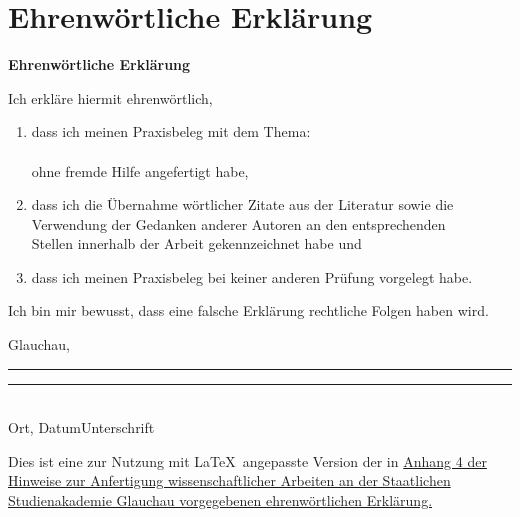 
\cleardoublepage 
\section{Ehrenwörtliche Erklärung}
\vspace*{1cm}
\begin{center}
\huge\textbf{Ehrenwörtliche Erklärung}\\
\end{center}
\vspace*{1cm}
\normalsize
Ich erkläre hiermit ehrenwörtlich,

\begin{enumerate}
	\vspace{1cm}
	\item dass ich meinen Praxisbeleg mit dem Thema:\\
	
	\textbf{\titel }\\

	ohne fremde Hilfe angefertigt habe,
	\item dass ich die Übernahme wörtlicher Zitate aus der Literatur sowie die\\ 		  
	Verwendung der Gedanken anderer Autoren an den entsprechenden\\
	Stellen innerhalb der Arbeit gekennzeichnet habe und
	\item dass ich meinen Praxisbeleg bei keiner anderen Prüfung vorgelegt habe.\\[1,5cm]
\end{enumerate}
Ich bin mir bewusst, dass eine falsche Erklärung rechtliche Folgen haben wird.\\[1,5cm]
			
\vfill

Glauchau, \abgabedatum \newline\noindent\rule{0.35\columnwidth}{0.4pt}\hspace{0.05\columnwidth}\rule{0.6\columnwidth}{0.4pt}\\
Ort, Datum\hspace{0.27\columnwidth}Unterschrift

{\footnotesize Dies ist eine zur Nutzung mit \LaTeX\ angepasste Version der in \href{https://www.ba-glauchau.de/fileadmin/glauchau/waehrend-des-studium/dokumente/pruefungen/4BA-F.207_Hinweise_zur_Anfertigung_wissenschaftlicher_Arbeiten.pdf}{Anhang 4 der Hinweise zur Anfertigung wissenschaftlicher Arbeiten an der Staatlichen Studienakademie Glauchau vorgegebenen ehrenwörtlichen Erklärung.}}

